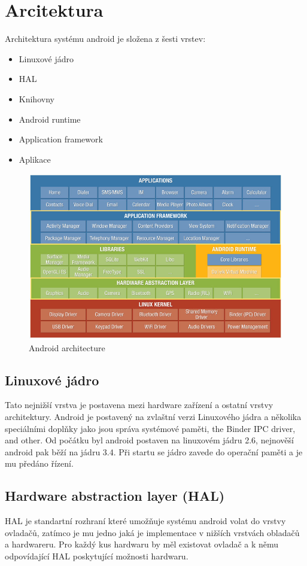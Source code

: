 \section{Arcitektura}
Architektura systému android je složena z šesti vrstev:
\begin{itemize}
\item Linuxové jádro
\item HAL
\item Knihovny
\item Android runtime
\item Application framework
\item Aplikace
\end{itemize}

\begin{figure}[h!]
    \centering
    \includegraphics[scale=0.5]{fig/android_architecture.jpg}
    \caption{Android architecture}
\end{figure}

\subsection{Linuxové jádro} %
Tato nejnižší vrstva je postavena mezi hardware zařízení a ostatní vrstvy architektury. Android je postavený na zvlaštní verzi Linuxového jádra a několika speciálními doplňky jako jsou správa systémové paměti, the Binder IPC driver, and other. Od počátku byl android postaven na linuxovém jádru 2.6, nejnověší android pak běží na jádru 3.4.  Při startu se jádro zavede do operační paměti a je mu předáno řízení.
\subsection{Hardware abstraction layer (HAL)} %
HAL je standartní rozhraní které umožňuje systému android volat do vrstvy ovladačů, zatímco je mu jedno jaká je implementace v nižších vrstvách obladačů a hardwareru. Pro každý kus hardwaru by měl existovat ovladač a k němu odpovídající HAL poskytující možnosti hardwaru.

